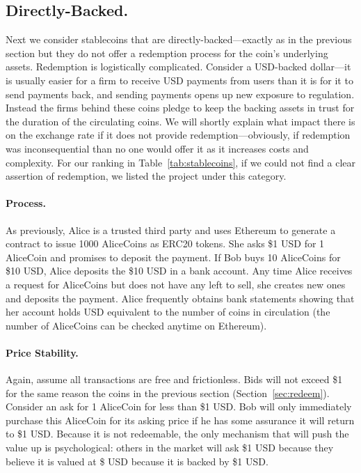 
\subsection{Directly-Backed.}
\label{sec:tether}

Next we consider stablecoins that are directly-backed---exactly as in the previous section but they do not offer a redemption process for the coin's underlying assets. Redemption is logistically complicated. Consider a USD-backed dollar---it is usually easier for a firm to receive USD payments from users than it is for it to send payments back, and sending payments opens up new exposure to regulation. Instead the firms behind these coins  pledge to keep the backing assets in trust for the duration of the circulating coins. We will shortly explain what impact there is on the exchange rate if it does not provide redemption---obviously, if redemption was inconsequential than no one would offer it as it increases costs and complexity. For our ranking in Table~\ref{tab:stablecoins}, if we could not find a clear assertion of redemption, we listed the project under this category.

\paragraph{Process.} As previously, Alice is a trusted third party and uses Ethereum to generate a contract to issue 1000 AliceCoins as ERC20 tokens. She asks \$1 USD for 1 AliceCoin and promises to deposit the payment. If Bob buys 10 AliceCoins for \$10 USD, Alice deposits the \$10 USD in a bank account. Any time Alice receives a request for AliceCoins but does not have any left to sell, she creates new ones and deposits the payment. Alice frequently obtains bank statements showing that her account holds USD equivalent to the number of coins in circulation (the number of AliceCoins can be checked anytime on Ethereum).

\paragraph{Price Stability.} Again, assume all transactions are free and frictionless. Bids will not exceed \$1 for the same reason the coins in the previous section (Section~\ref{sec:redeem}). Consider an ask for 1 AliceCoin for less than \$1 USD. Bob will only immediately purchase this AliceCoin for its asking price if he has some assurance it will return to \$1 USD. Because it is not redeemable, the only mechanism that will push the value up is psychological: others in the market will ask \$1 USD because they believe it is valued at \$ USD because it is backed by \$1 USD.

